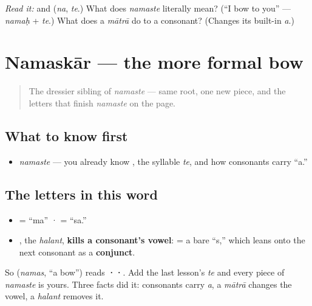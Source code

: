 \begin{tcolorbox}[breakable,colback=teal!4,colframe=teal!35!black,title={Before you move on}]
\emph{Read it:} \textbf{} and \textbf{} (\emph{na}, \emph{te}.) What does \emph{namaste} literally mean? (\textquotedblleft{}I bow to you\textquotedblright{} — \emph{namaḥ} + \emph{te}.) What does a \emph{mātrā} do to a consonant? (Changes its built-in \emph{a}.)
\end{tcolorbox}
\section[\texorpdfstring{\hi{नमस्कार} (namaskār)}{नमस्कार (namaskār)}]{Namaskār — the more formal bow}

\label{lesson:HI-C01-namaskar}



\begin{quote}
The dressier sibling of \emph{namaste} — same root, one new piece, and the letters that finish \emph{namaste} on the page.
\end{quote}

\subsection*{What to know first}
\begin{itemize}
\raggedright
  \item \emph{namaste} — you already know \textbf{}, the syllable \emph{te}, and how consonants carry \textquotedblleft{}a.\textquotedblright{}
\end{itemize}

\subsection*{The letters in this word}
\begin{itemize}
\raggedright
  \item \textbf{} = \textquotedblleft{}ma\textquotedblright{} · \textbf{} = \textquotedblleft{}sa.\textquotedblright{}
  \item \textbf{}, the \emph{halant}, \textbf{kills a consonant's vowel}: \textbf{} = a bare \textquotedblleft{}s,\textquotedblright{} which leans onto the next consonant as a \textbf{conjunct}.
\end{itemize}

So \textbf{} (\emph{namas}, \textquotedblleft{}a bow\textquotedblright{}) reads \textbf{··}. Add the last lesson's \emph{te} and every piece of \emph{namaste} is yours. Three facts did it: consonants carry \emph{a}, a \emph{mātrā} changes the vowel, a \emph{halant} removes it.

